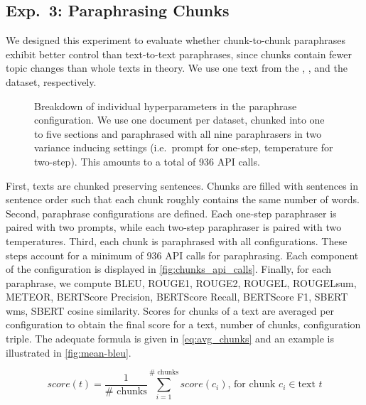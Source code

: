 \subsection{Exp.\ 3: Paraphrasing Chunks}
\label{subsec:paraphrasing_chunks}

We designed this experiment to evaluate whether chunk-to-chunk paraphrases exhibit better control than text-to-text paraphrases, since chunks contain fewer topic changes than whole texts in theory.
We use one text from the \dataBlog{}, \dataGutenberg{}, and the \dataStudent{} dataset, respectively.


\begin{figure}[htbp]
  \centering
  
  \caption[Paraphrase configuration hyperparameters.]{Breakdown of individual hyperparameters in the paraphrase configuration.
  We use one document per dataset, chunked into one to five sections and paraphrased with all nine paraphrasers in two variance inducing settings (i.e.\ prompt for one-step, temperature for two-step).
  This amounts to a total of 936 API calls. 
  }
  \label{fig:chunks_api_calls}
\end{figure}


First, texts are chunked preserving sentences.
Chunks are filled with sentences in sentence order such that each chunk roughly contains the same number of words.
Second, paraphrase configurations are defined.
Each one-step paraphraser is paired with two prompts, while each two-step paraphraser is paired with two temperatures.
Third, each chunk is paraphrased with all configurations.
These steps account for a minimum of 936 API calls for paraphrasing.
Each component of the configuration is displayed in \autoref{fig:chunks_api_calls}.
Finally, for each paraphrase, we compute BLEU, ROUGE1, ROUGE2, ROUGEL, ROUGELsum, METEOR, BERTScore Precision, BERTScore Recall, BERTScore F1, SBERT \ac{wms}, SBERT cosine similarity.
Scores for chunks of a text are averaged per configuration to obtain the final score for a text, number of chunks, configuration triple.
The adequate formula is given in \autoref{eq:avg_chunks} and an example is illustrated in \autoref{fig:mean-bleu}.

\begin{equation}
    score(t) = \frac{1}{\#\text{ chunks}}\sum_{i=1}^{\#\text{ chunks}}score(c_i)\text{, for chunk }c_i \in \text{text }t
\label{eq:avg_chunks}
\end{equation}

